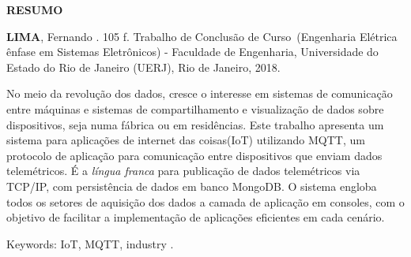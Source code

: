 \begin{center}
\textbf{RESUMO}
\end{center}

%
%

$\!$\\

\hspace{-1.3cm}\textbf{LIMA}, Fernando \textit{\setTitulo}. 105 f. Trabalho de Conclusão de Curso~(Engenharia Elétrica ênfase em Sistemas Eletrônicos) - Faculdade de Engenharia, Universidade do Estado do Rio de Janeiro (UERJ), Rio de Janeiro, 2018.

\vspace{.2cm}

No meio da revolução dos dados, cresce o interesse em sistemas de comunicação entre máquinas e sistemas de compartilhamento e visualização de dados  sobre dispositivos, seja numa fábrica ou em residências. Este trabalho apresenta um sistema para aplicações de internet das coisas(IoT) utilizando MQTT, um protocolo de aplicação para comunicação entre dispositivos que enviam dados telemétricos. É  a \textit{língua franca} para publicação de dados telemétricos via TCP/IP, com persistência de dados em banco MongoDB. O sistema engloba todos os setores de aquisição dos dados a camada de aplicação em consoles, com o objetivo de facilitar a implementação de aplicações eficientes em cada cenário.

\vspace{1cm}

\hspace{-1.3cm}Keywords: IoT, MQTT, industry .